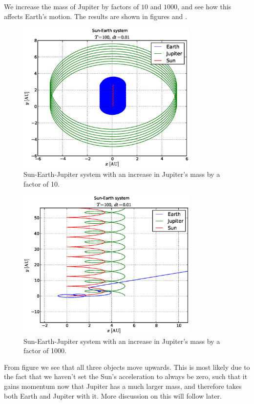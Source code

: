 %
We increase the mass of Jupiter by factors of $10$ and $1000$, and see how this
affects Earth's motion. The results are shown in figures  and
.
%
\begin{figure}[htpb]
	\centering
	\includegraphics[width=0.8\textwidth]{figures/sun_earth_jupiter_incmass10}
	\caption{Sun-Earth-Jupiter system with an increase in Jupiter's mass by a
	factor of 10.}
	\label{fig:jupiter10}
\end{figure}
%
\begin{figure}[htpb]
	\centering
	\includegraphics[width=0.8\textwidth]{figures/sun_earth_jupiter_incmass1000}
	\caption{Sun-Earth-Jupiter system with an increase in Jupiter's mass by a
	factor of 1000.}
	\label{fig:jupiter1000}
\end{figure}
%
From figure  we see that all three objects move upwards. This
is most likely due to the fact that we haven't set the Sun's acceleration to
always be zero, such that it gains momentum now that Jupiter has a much larger
mass, and therefore takes both Earth and Jupiter with it. More discussion on
this will follow later.

